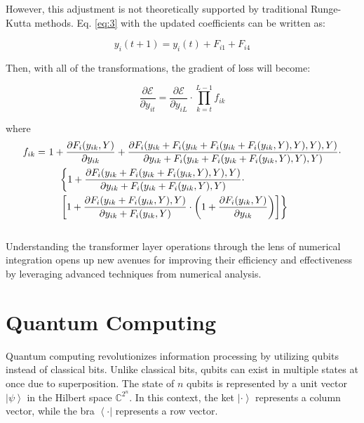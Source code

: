 \documentclass[12pt,a4paper]{report}
\begin{document}
However, this adjustment is not theoretically supported by traditional Runge-Kutta methods. Eq. \ref{eq:3} with the updated coefficients can be written as:

\begin{equation}
  y_i(t + 1) = y_i(t) + F_{i1} + F_{i4}
\end{equation}

Then, with all of the transformations, the gradient of loss will become:

\begin{equation}
  \frac{\partial \mathcal{E}}{\partial y_{it}} = \frac{\partial \mathcal{E}}{\partial y_{iL}} \cdot \prod_{k=t}^{L-1} f_{ik}
\end{equation}

where
\begin{align}
  f_{ik} = & \ 1 + \frac{\partial F_i(y_{ik}, Y)}{\partial y_{ik}} + \frac{\partial F_i(y_{ik} + F_i(y_{ik} + F_i(y_{ik} + F_i(y_{ik}, Y), Y), Y), Y)}{\partial y_{ik} + F_i(y_{ik} + F_i(y_{ik} + F_i(y_{ik}, Y), Y), Y)} \cdot \notag \\
           & \ \ \ \ \left\{ 1 + \frac{\partial F_i(y_{ik} + F_i(y_{ik} + F_i(y_{ik}, Y), Y), Y)}{\partial y_{ik} + F_i(y_{ik} + F_i(y_{ik}, Y), Y)} \cdot \right. \notag                                                               \\
           & \ \ \ \ \left. \left[ 1 + \frac{\partial F_i(y_{ik} + F_i(y_{ik}, Y), Y)}{\partial y_{ik} + F_i(y_{ik}, Y)} \cdot \left( 1 + \frac{\partial F_i(y_{ik}, Y)}{\partial y_{ik}} \right) \right] \right\}
\end{align}
\\
Understanding the transformer layer operations through the lens of numerical integration opens up new avenues for improving their efficiency and effectiveness by leveraging advanced techniques from numerical analysis.

\section{Quantum Computing}
Quantum computing revolutionizes information processing by utilizing qubits instead of classical bits. Unlike classical bits, qubits can exist in multiple states at once due to superposition. The state of \(n\) qubits is represented by a unit vector \(\left| \psi \right\rangle\) in the Hilbert space \(\mathbb{C}^{2^n}\). In this context, the ket \(\left| \cdot \right\rangle\) represents a column vector, while the bra \(\left\langle \cdot \right|\) represents a row vector.
\end{document}
